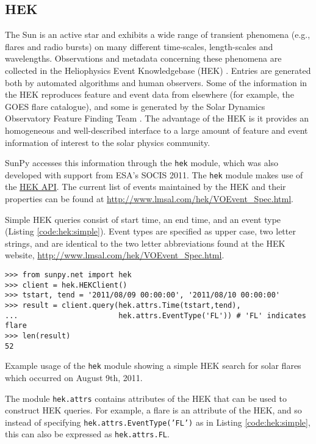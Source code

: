 \subsection{HEK}\label{ssec:hek}

The Sun is an active star and exhibits a wide range of transient phenomena 
(e.g., flares and radio bursts) on many different time-scales, length-scales and 
wavelengths. Observations and metadata concerning these phenomena are collected 
in the Heliophysics Event Knowledgebase (HEK) \citep{hek2012}.  Entries are generated both by 
automated algorithms and human observers.  Some of the information in the HEK 
reproduces feature and event data from elsewhere (for example, the GOES flare catalogue),
and some is generated by the Solar Dynamics Observatory Feature Finding Team 
\citep{martens2012}.  The advantage of the HEK is it 
provides an homogeneous and well-described interface to a large amount of 
feature and event information of interest to the solar physics community.


SunPy accesses this information through the \texttt{hek} module, which was also
developed with support from ESA's SOCIS 2011.  The \texttt{hek} module makes 
use of the 
\href{http://vso.stanford.edu/hekwiki/ApplicationProgrammingInterface?action=print}{HEK
 API}.
The current list of events maintained by the HEK and their properties can be 
found at \url{http://www.lmsal.com/hek/VOEvent_Spec.html}.

Simple HEK queries consist of start time, an end time, and an event type 
(Listing \ref{code:hek:simple}). Event types are specified as upper case, 
two letter strings, and are 
identical to the two letter abbreviations found at the HEK website, 
\url{http://www.lmsal.com/hek/VOEvent_Spec.html}.

\begin{listing}[H]
\begin{verbatim}
>>> from sunpy.net import hek
>>> client = hek.HEKClient()
>>> tstart, tend = '2011/08/09 00:00:00', '2011/08/10 00:00:00'
>>> result = client.query(hek.attrs.Time(tstart,tend), 
...                       hek.attrs.EventType('FL')) # 'FL' indicates flare
>>> len(result)
52
\end{verbatim}
\caption{Example usage of the \texttt{hek} module showing a simple HEK search for solar flares
which occurred on August 9th, 2011.}
\label{code:hek:simple}
\end{listing}

The module \texttt{hek.attrs} contains attributes of the HEK that can be used to
construct HEK queries.  For example, a flare is an attribute of the HEK, and so 
instead of specifying \texttt{hek.attrs.EventType('FL')} as in Listing 
\ref{code:hek:simple}, this can also be expressed as \texttt{hek.attrs.FL}. 

